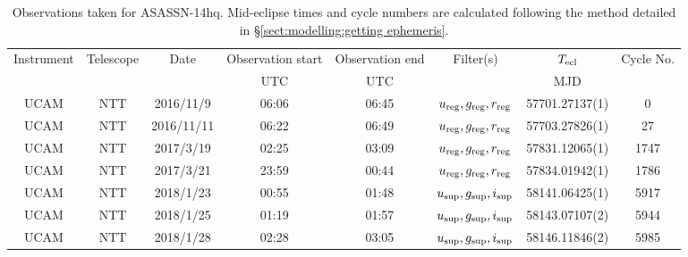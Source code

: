 \begin{table}
	\begin{center}
		\caption{Observations taken for ASASSN-14hq. Mid-eclipse times and cycle numbers are calculated following the method detailed in \S\ref{sect:modelling:getting ephemeris}.}
		\label{table:observing:observation logs ASASSN-14hq}
		\begin{tabular}{cccccccc}
			\hline
			Instrument & Telescope & Date & Observation start & Observation end & Filter(s) & $T_{\rm ecl}$ & Cycle No. \\
			 &  &  & UTC & UTC &  & MJD &  \\
			\hline
			\hline
			 UCAM & NTT & 2016/11/9  & 06:06 & 06:45 & $u_{\rm reg},g_{\rm reg},r_{\rm reg}$ & 57701.27137(1)                                                                                                            &                                           0 \\
			 UCAM & NTT & 2016/11/11 & 06:22 & 06:49 & $u_{\rm reg},g_{\rm reg},r_{\rm reg}$ & 57703.27826(1)                                                                                                            &                                          27 \\
			 UCAM & NTT & 2017/3/19  & 02:25 & 03:09 & $u_{\rm reg},g_{\rm reg},r_{\rm reg}$ & 57831.12065(1)                                                                                                            &                                        1747 \\
			 UCAM & NTT & 2017/3/21  & 23:59 & 00:44 & $u_{\rm reg},g_{\rm reg},r_{\rm reg}$ & 57834.01942(1)                                                                                                            &                                        1786 \\
			 UCAM & NTT & 2018/1/23  & 00:55 & 01:48 & $u_{\rm sup},g_{\rm sup},i_{\rm sup}$ & 58141.06425(1)                                                                                                            &                                        5917 \\
			 UCAM & NTT & 2018/1/25  & 01:19 & 01:57 & $u_{\rm sup},g_{\rm sup},i_{\rm sup}$ & 58143.07107(2)                                                                                                            &                                        5944 \\
			 UCAM & NTT & 2018/1/28  & 02:28 & 03:05 & $u_{\rm sup},g_{\rm sup},i_{\rm sup}$ & 58146.11846(2)                                                                                                            &                                        5985 \\

\end{tabular}
\end{center}
\end{table}

